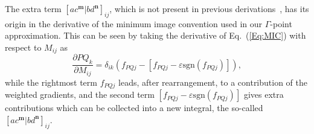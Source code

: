 \documentclass[prl,preprint,doublespace]{revtex4} %
\begin{document}
The extra term $[ac^\mathbf{m}|bd^\mathbf{n}]_{ij}$, which is not present in 
previous derivations~\cite{MTobita03,KKudin00B,KDoll04}, 
has its origin in the derivative of the minimum image convention used in 
our $\Gamma$-point approximation. 
This can be seen by taking the derivative of Eq.~(\ref{Eq:MIC}) with respect to $M_{ij}$ as
\begin{equation*}
  \frac{\partial PQ_k}{\partial M_{ij}}=\delta_{ik}(f_{PQj}-[f_{PQj}-\varepsilon\mathrm{sgn}(f_{PQj})]),
\end{equation*}
while the rightmost term $f_{PQj}$ leads, after rearrangement, 
to a contribution of the weighted gradients, 
and the second term $[f_{PQj}-\varepsilon \mathrm{sgn}(f_{PQj})]$
gives extra contributions which can be collected into a new integral, the so-called
$[ac^\mathbf{m}|bd^\mathbf{n}]_{ij}$.

\end{document}
